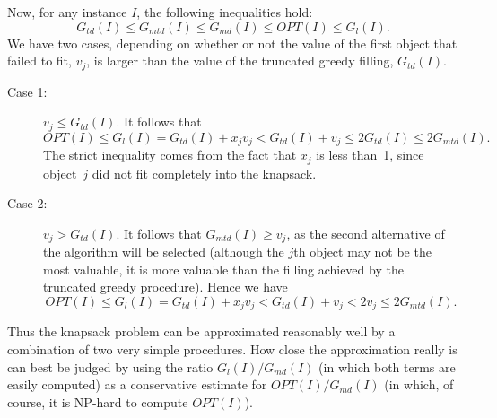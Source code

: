 \documentclass[11pt]{article}
\begin{document}
Now, for any instance $I$, the following inequalities hold:
\begin{displaymath}
    G_{td}(I) \leq G_{mtd}(I) \leq G_{md}(I) \leq OPT(I) \leq G_l (I).
\end{displaymath}
We have two cases, depending on whether or not the value of the first
object that failed to fit, $v_j$, is larger than the value of the truncated
greedy filling, $G_{td}(I)$.
\begin{description}
  \item[Case 1:]
    $v_j \leq G_{td}(I)$.  It follows that
    \begin{displaymath}
      OPT(I) \leq G_l(I) = G_{td}(I) + x_j v_j < G_{td}(I) + v_j \leq 2G_{td}(
I) \leq 2G_{mtd}(I).
    \end{displaymath}
    The strict inequality comes from the fact that $x_j$ is less than~1,
    since object~$j$ did not fit completely into the knapsack.
  \item[Case 2:]
    $v_j > G_{td}(I)$.  It follows that $G_{mtd}(I) \geq v_j$, as the second
    alternative of the algorithm will be selected (although the $j$th object
    may not be the most valuable, it is more valuable than the filling
    achieved by the truncated greedy procedure).  Hence we have
    \begin{displaymath}
      OPT(I) \leq G_l(I) = G_{td}(I) + x_j v_j < G_{td}(I) + v_j < 2v_j \leq 2
G_{mtd}(I).
    \end{displaymath}
\end{description}
Thus the knapsack problem can be approximated reasonably well by a combination
of two very simple procedures.   How close the approximation really is
can best be judged by using the ratio $G_l(I)/G_{md}(I)$ (in which both terms
are easily computed) as a conservative estimate for $OPT(I)/G_{md}(I)$ (in
which, of course, it is NP-hard to compute $OPT(I)$).
\end{document}
